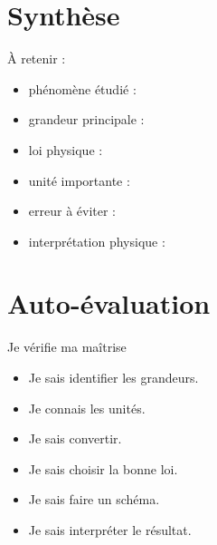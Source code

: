 \documentclass[11pt,a4paper]{article}
\begin{document}
\section{Synthèse}

\begin{cadresynthese}
À retenir :

\begin{itemize}
    \item phénomène étudié : \dotfill
    \item grandeur principale : \dotfill
    \item loi physique : \dotfill
    \item unité importante : \dotfill
    \item erreur à éviter : \dotfill
    \item interprétation physique : \dotfill
\end{itemize}
\end{cadresynthese}

\section{Auto-évaluation}

\begin{cadregris}{Je vérifie ma maîtrise}
\begin{itemize}
    \item[$\square$] Je sais identifier les grandeurs.
    \item[$\square$] Je connais les unités.
    \item[$\square$] Je sais convertir.
    \item[$\square$] Je sais choisir la bonne loi.
    \item[$\square$] Je sais faire un schéma.
    \item[$\square$] Je sais interpréter le résultat.
\end{itemize}
\end{cadregris}
\end{document}
